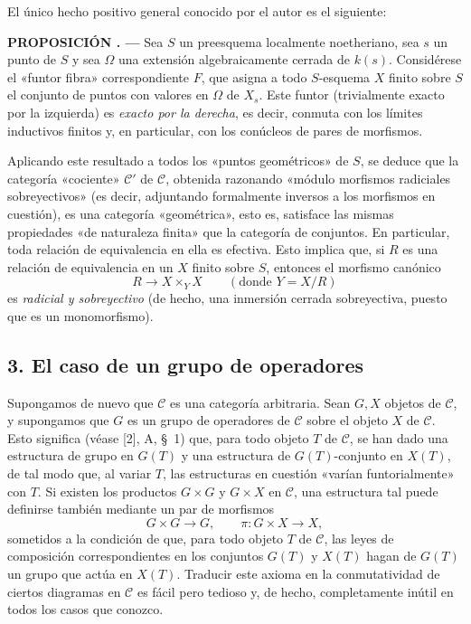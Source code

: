 \documentclass[11pt,twoside,openany]{book}
\numberwithin{equation}{section}
\newcommand{\src}[1]{%
  \phantomsection\hypertarget{src:#1}{}%
  \marginpar{\raggedleft\footnotesize\sffamily #1}%
}
\theoremstyle{plain}
\theoremstyle{definition}
\theoremstyle{remark}
\newcommand{\result}[2]{%
  \par\medskip\noindent\textbf{#1%
  \if\relax\detokenize{#2}\relax\else\space#2\fi. ---}\enspace
}
\newcommand{\FgaUnitKey}{frontmatter}
\renewcommand{\src}[1]{%
  \phantomsection\hypertarget{src:\FgaUnitKey:#1}{}%
  \marginpar{\raggedleft\footnotesize\sffamily #1}%
}
\theoremstyle{plain}
\theoremstyle{definition}
\theoremstyle{remark}
\begin{document}
El único hecho positivo general conocido por el autor es el siguiente:

\result{PROPOSICIÓN}{2.1} Sea $S$ un preesquema localmente noetheriano, sea
$s$ un punto de $S$ y sea $\Omega$ una extensión algebraicamente cerrada de
$k(s)$. Considérese el
\src{104}«funtor fibra» correspondiente $F$, que asigna a todo $S$-esquema
$X$ finito sobre $S$ el conjunto de puntos con valores en $\Omega$ de $X_s$.
Este funtor (trivialmente exacto por la izquierda) es \emph{exacto por la
derecha}, es decir, conmuta con los límites inductivos finitos y, en
particular, con los conúcleos de pares de morfismos.

Aplicando este resultado a todos los «puntos geométricos» de $S$, se deduce
que la categoría «cociente» $\mathcal C'$ de $\mathcal C$, obtenida razonando
«módulo morfismos radiciales sobreyectivos» (es decir, adjuntando formalmente
inversos a los morfismos en cuestión), es una categoría «geométrica», esto es,
satisface las mismas propiedades «de naturaleza finita» que la categoría de
conjuntos. En particular, toda relación de equivalencia en ella es efectiva.
Esto implica que, si $R$ es una relación de equivalencia en un $X$ finito
sobre $S$, entonces el morfismo canónico
\[
  R\longrightarrow X\times_Y X\qquad (\text{donde }Y=X/R)
\]
es \emph{radicial y sobreyectivo} (de hecho, una inmersión cerrada
sobreyectiva, puesto que es un monomorfismo).

\subsection*{3. El caso de un grupo de operadores}

Supongamos de nuevo que $\mathcal C$ es una categoría arbitraria. Sean $G,X$
objetos de $\mathcal C$, y supongamos que $G$ es un grupo de operadores de
$\mathcal C$ sobre el objeto $X$ de $\mathcal C$. Esto significa (véase [2],
A, \S~1) que, para todo objeto $T$ de $\mathcal C$, se han dado una estructura
de grupo en $G(T)$ y una estructura de $G(T)$-conjunto en $X(T)$, de tal modo
que, al variar $T$, las estructuras en cuestión «varían funtorialmente» con
$T$. Si existen los productos $G\times G$ y $G\times X$ en $\mathcal C$, una
estructura tal puede definirse también mediante un par de morfismos
\[
  G\times G\longrightarrow G,
  \qquad \pi:G\times X\longrightarrow X,
\]
sometidos a la condición de que, para todo objeto $T$ de $\mathcal C$, las
leyes de composición correspondientes en los conjuntos $G(T)$ y $X(T)$ hagan
de $G(T)$ un grupo que actúa en $X(T)$. Traducir este axioma en la
conmutatividad de ciertos diagramas en $\mathcal C$ es fácil pero tedioso y,
de hecho, completamente inútil en todos los casos que conozco.
\end{document}

